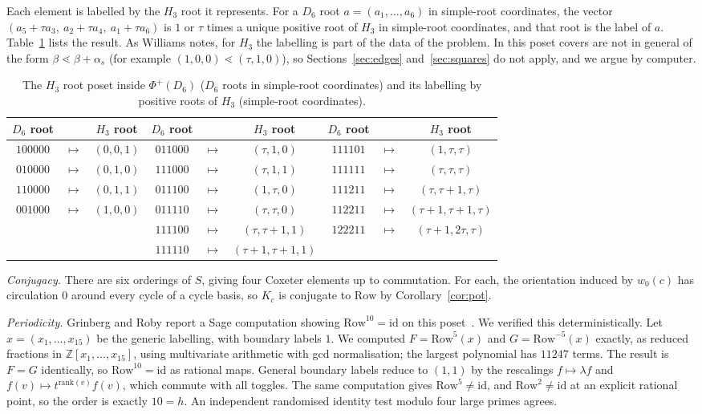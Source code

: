 \documentclass[11pt]{amsart}
\theoremstyle{definition}
\newcommand{\Row}{\mathrm{Row}}
\begin{document}
Each element is labelled by the $H_3$ root it represents. For a $D_6$ root $a=(a_1,\dots,a_6)$ in simple-root coordinates, the vector $(a_5+\tau a_3,\ a_2+\tau a_4,\ a_1+\tau a_6)$ is $1$ or $\tau$ times a unique positive root of $H_3$ in simple-root coordinates, and that root is the label of $a$. Table~\ref{tab:H3} lists the result. As Williams notes, for $H_3$ the labelling is part of the data of the problem. In this poset covers are not in general of the form $\beta\lessdot\beta+\alpha_s$ (for example $(1,0,0)\lessdot(\tau,1,0)$), so Sections~\ref{sec:edges} and~\ref{sec:squares} do not apply, and we argue by computer.

\begin{table}[h]\centering\small
\begin{tabular}{ccc|ccc|ccc}
$D_6$ root & & $H_3$ root & $D_6$ root & & $H_3$ root & $D_6$ root & & $H_3$ root\\\hline
$100000$&$\mapsto$&$(0,0,1)$ & $011000$&$\mapsto$&$(\tau,1,0)$ & $111101$&$\mapsto$&$(1,\tau,\tau)$\\
$010000$&$\mapsto$&$(0,1,0)$ & $111000$&$\mapsto$&$(\tau,1,1)$ & $111111$&$\mapsto$&$(\tau,\tau,\tau)$\\
$110000$&$\mapsto$&$(0,1,1)$ & $011100$&$\mapsto$&$(1,\tau,0)$ & $111211$&$\mapsto$&$(\tau,\tau+1,\tau)$\\
$001000$&$\mapsto$&$(1,0,0)$ & $011110$&$\mapsto$&$(\tau,\tau,0)$ & $112211$&$\mapsto$&$(\tau+1,\tau+1,\tau)$\\
 & & & $111100$&$\mapsto$&$(\tau,\tau+1,1)$ & $122211$&$\mapsto$&$(\tau+1,2\tau,\tau)$\\
 & & & $111110$&$\mapsto$&$(\tau+1,\tau+1,1)$ & & & \\
\end{tabular}
\caption{The $H_3$ root poset inside $\Phi^+(D_6)$ ($D_6$ roots in simple-root coordinates) and its labelling by positive roots of $H_3$ (simple-root coordinates).}\label{tab:H3}
\end{table}

\emph{Conjugacy.} There are six orderings of $S$, giving four Coxeter elements up to commutation. For each, the orientation induced by $w_0(c)$ has circulation $0$ around every cycle of a cycle basis, so $K_c$ is conjugate to $\Row$ by Corollary~\ref{cor:pot}.

\emph{Periodicity.} Grinberg and Roby report a Sage computation showing $\Row^{10}=\mathrm{id}$ on this poset~\cite[\S21]{GR1}. We verified this deterministically. Let $x=(x_1,\dots,x_{15})$ be the generic labelling, with boundary labels $1$. We computed $F=\Row^5(x)$ and $G=\Row^{-5}(x)$ exactly, as reduced fractions in $\mathbb Z[x_1,\dots,x_{15}]$, using multivariate arithmetic with gcd normalisation; the largest polynomial has $11247$ terms. The result is $F=G$ identically, so $\Row^{10}=\mathrm{id}$ as rational maps. General boundary labels reduce to $(1,1)$ by the rescalings $f\mapsto\lambda f$ and $f(v)\mapsto t^{\mathrm{rank}(v)}f(v)$, which commute with all toggles. The same computation gives $\Row^5\neq\mathrm{id}$, and $\Row^2\neq\mathrm{id}$ at an explicit rational point, so the order is exactly $10=h$. An independent randomised identity test modulo four large primes agrees.
\end{document}
